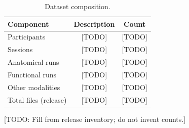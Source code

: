 \begin{table}[htbp]
\centering
\caption{Dataset composition.}
\label{tab:dataset_composition}
\begin{tabular}{@{}lcc@{}}
\toprule
\textbf{Component} & \textbf{Description} & \textbf{Count} \\
\midrule
Participants & {[TODO]} & {[TODO]} \\
Sessions & {[TODO]} & {[TODO]} \\
Anatomical runs & {[TODO]} & {[TODO]} \\
Functional runs & {[TODO]} & {[TODO]} \\
Other modalities & {[TODO]} & {[TODO]} \\
Total files (release) & {[TODO]} & {[TODO]} \\
\bottomrule
\end{tabular}

{\footnotesize {[TODO: Fill from release inventory; do not invent counts.]}}
\end{table}
